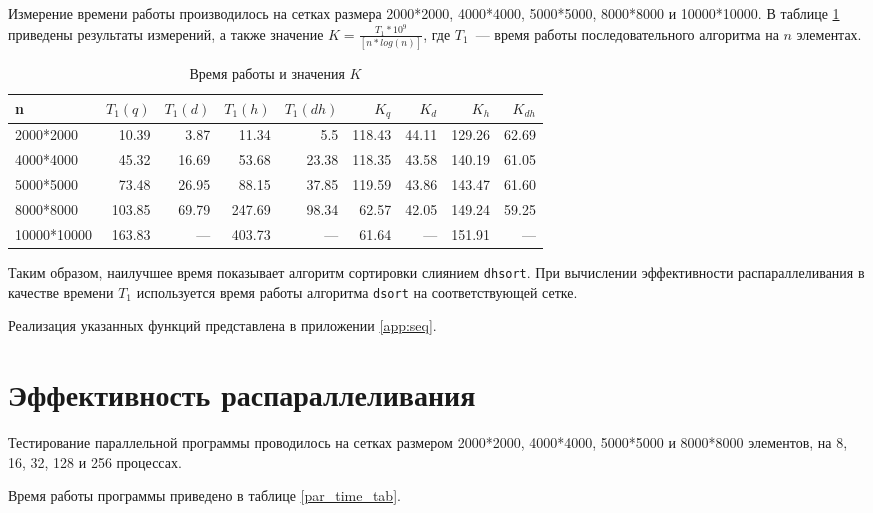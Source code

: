 \documentclass[oneside,final,14pt]{extreport}
\begin{document}
Измерение времени работы производилось на сетках размера 2000*2000,
4000*4000, 5000*5000, 8000*8000 и 10000*10000. В таблице \ref{seq_time_tab}
приведены результаты
измерений, а также значение $K = \frac{T_1 * 10^9}{[ n * log(n)]}$, где
$T_1$~--- время работы последовательного алгоритма на $n$ элементах.

\begin{table}[hp]
\centering
\begin{tabular}{|l|r|r|r|r|r|r|r|r|}\hline
    n       & $T_1(q)$ & $T_1(d)$ & $T_1(h)$ & $T_1(dh)$ & $K_q$ & $K_d$ & $K_h$ & $K_{dh}$  \\ \hline
2000*2000   & 10.39    & 3.87     & 11.34    & 5.5       & 118.43& 44.11 & 129.26& 62.69   \\ \hline
4000*4000   & 45.32    & 16.69    & 53.68    & 23.38     & 118.35& 43.58 & 140.19& 61.05   \\ \hline
5000*5000   & 73.48    & 26.95    & 88.15    & 37.85     & 119.59& 43.86 & 143.47& 61.60   \\ \hline
8000*8000   & 103.85   & 69.79    & 247.69   & 98.34     & 62.57 & 42.05 & 149.24& 59.25   \\ \hline
10000*10000 & 163.83   & ---      & 403.73   & ---       & 61.64 & ---   & 151.91& ---     \\ \hline
\end{tabular}
\caption{Время работы и значения $K$}
\label{seq_time_tab}
\end{table}

Таким образом, наилучшее время показывает алгоритм сортировки слиянием
\texttt{dhsort}. При вычислении эффективности распараллеливания в качестве
времени $T_1$ используется время работы алгоритма \texttt{dsort}
на соответствующей сетке.

Реализация указанных функций представлена в приложении \ref{app:seq}.

\section*{Эффективность распараллеливания}

Тестирование параллельной программы проводилось на сетках размером
2000*2000, 4000*4000, 5000*5000 и 8000*8000 элементов, на 8, 16, 32, 128
и 256 процессах.

Время работы программы приведено в таблице \ref{par_time_tab}.
\end{document}
